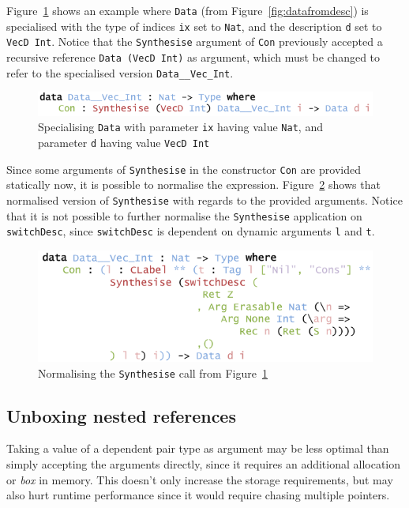 \documentclass{ituthesis}
\newcommand{\ttconstructor}[1]{\textcolor{constructor-color}{\texttt{#1}}}
\newcommand{\tttype}[1]{\textcolor{type-color}{\texttt{#1}}}
\newcommand{\ttdec}[1]{\textcolor{declared-var-color}{\texttt{#1}}}
\newcommand{\ttvar}[1]{\textcolor{local-var-color}{\texttt{#1}}}
\theoremstyle{break}
\begin{document}
Figure~\ref{fig:pesp} shows an example where \tttype{Data} (from Figure~\ref{fig:datafromdesc}) is specialised with the type of indices \ttvar{ix} set to \tttype{Nat},
and the description \ttvar{d} set to \ttdec{VecD}~\tttype{Int}.
Notice that the \ttdec{Synthesise} argument of \ttvar{Con} previously accepted a recursive reference \tttype{Data}~\texttt{(}\ttdec{VecD}~\tttype{Int}\texttt{)} as argument,
which must be changed to refer to the specialised version \tttype{Data\_\_Vec\_Int}.

\begin{figure}[ht]
\begin{center}
    \includegraphics[scale=0.5]{Figures/PESpecialising.png}
\end{center}
\caption{Specialising \tttype{Data} with parameter \ttvar{ix} having value \tttype{Nat}, and parameter \ttvar{d} having value \ttdec{VecD}~\tttype{Int}}
\label{fig:pesp}
\end{figure}

Since some arguments of \ttdec{Synthesise} in the constructor \ttconstructor{Con} are provided statically now, it is possible to normalise the expression.
Figure~\ref{fig:pespext} shows that normalised version of \ttdec{Synthesise} with regards to the provided arguments.
Notice that it is not possible to further normalise the \ttdec{Synthesise} application on \ttdec{switchDesc}, since \ttdec{switchDesc} is dependent on dynamic arguments \ttvar{l} and \ttvar{t}.

\begin{figure}[ht]
\begin{center}
    \includegraphics[scale=0.5]{Figures/PESpecialisingExpansion.png}
\end{center}
\caption{Normalising the \ttdec{Synthesise} call from Figure~\ref{fig:pesp}}
\label{fig:pespext}
\end{figure}

\subsection{Unboxing nested references}
\label{sub:Unboxingnestedreferences}
Taking a value of a dependent pair type as argument may be less optimal than simply accepting the arguments directly,
since it requires an additional allocation or \textit{box} in memory.
This doesn't only increase the storage requirements, but may also hurt runtime performance since it would require chasing multiple pointers.
\end{document}
